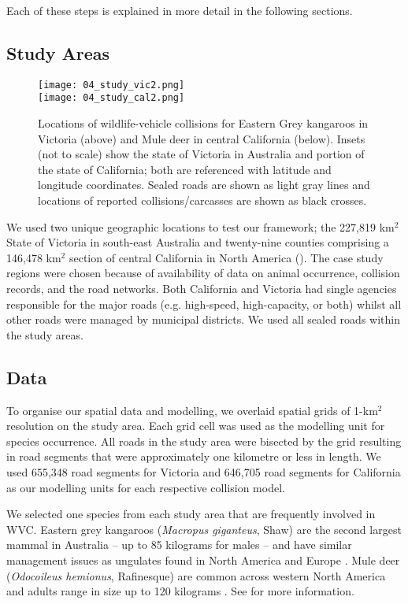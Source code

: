Each of these steps is explained in more detail in the following sections.

\subsection{Study Areas}

\begin{figure*}[!t]
  \centering
  \texttt{[image: 04\_study\_vic2.png]}\\
  \texttt{[image: 04\_study\_cal2.png]}
  \caption[Locations of WVC for Eastern Grey kangaroos in Victoria and Mule deer in central California]{Locations of wildlife-vehicle collisions for Eastern Grey kangaroos in Victoria (above) and Mule deer in central California (below). Insets (not to scale) show the state of Victoria in Australia and portion of the state of California; both are referenced with latitude and longitude coordinates.  Sealed roads are shown as light gray lines and locations of reported collisions/carcasses are shown as black crosses.}
  \label{cal_study_area}
\end{figure*}

We used two unique geographic locations to test our framework; the 227,819 km$^2$ State of Victoria in south-east Australia and twenty-nine counties comprising a 146,478 km$^2$ section of central California in North America (). The case study regions were chosen because of availability of data on animal occurrence, collision records, and the road networks. Both California and Victoria had single agencies responsible for the major roads (e.g. high-speed, high-capacity, or both) whilst all other roads were managed by municipal districts. We used all sealed roads within the study areas.

\subsection{Data}

To organise our spatial data and modelling, we overlaid spatial grids of 1-km$^2$ resolution on the study area. Each grid cell was used as the modelling unit for species occurrence. All roads in the study area were bisected by the grid resulting in road segments that were approximately one kilometre or less in length. We used 655,348 road segments for Victoria and 646,705 road segments for California as our modelling units for each respective collision model.

We selected one species from each study area that are frequently involved in WVC. Eastern grey kangaroos (\textit{Macropus giganteus}, Shaw) are the second largest mammal in Australia -- up to 85 kilograms for males \citep{vand08} -- and have similar management issues as ungulates found in North America and Europe \citep{crof04,coul10}.  Mule deer (\textit{Odocoileus hemionus}, Rafinesque) are common across western North America and adults range in size up to 120 kilograms \citep{kays09}. See  for more information.

